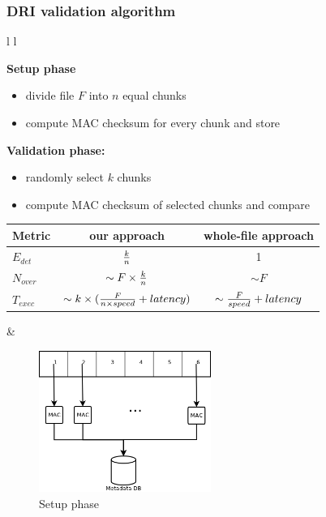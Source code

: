 \documentclass[9pt]{beamer}
\begin{document}
\begin{frame}
\frametitle{\hspace{5mm} \textbf{DRI validation algorithm}}
\begin{tabular}{l l}
	\begin{minipage}{0.4\textwidth}
	\textbf{Setup phase}
	\begin{itemize}
		\item divide file $F$ into $n$ equal chunks
		\item compute MAC checksum for every chunk and store
	\end{itemize}
	\textbf{Validation phase:}
	\begin{itemize}
		\item randomly select $k$ chunks
		\item compute MAC checksum of selected chunks and compare
	\end{itemize}
	\begin{table}[h!]
	\centering
	{\footnotesize
	\begin{tabular}{|l||c|c|}
		\hline
		Metric     & our approach                                           & whole-file approach \\ \hline \hline
		$E_{det}$  & ${k \over n}$                                          & 1 \\ \hline
		$N_{over}$ & $\sim F \times {k \over n}$                            & $\sim F$ \\ \hline
		$T_{exec}$ & $\sim k \times ({F \over {n \times speed}} + latency)$ & $\sim {F \over speed} + latency$ \\ \hline
	\end{tabular}
	}
	\end{table}
	\end{minipage}
	&
	\begin{minipage}{0.6\textwidth}
	\begin{figure}
		\centering
		\includegraphics[width=0.5\textwidth]{img/algorithm-setup.png}
		\caption{Setup phase}
	\end{figure}

\end{minipage}
\end{tabular}
\end{frame}
\end{document}
